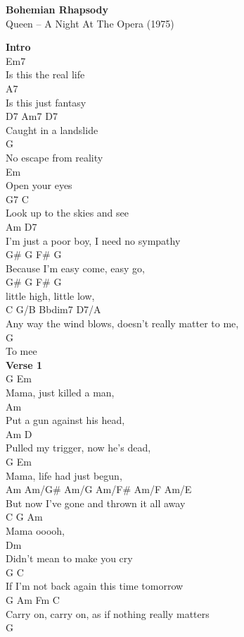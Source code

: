 \documentclass[a4paper]{article}
\begin{document}
    \begin{center}
        \textbf{Bohemian Rhapsody}
        ~\\
        Queen -- A Night At The Opera (1975)
    \end{center}
    {
        \scriptsize
        \textbf{Intro}
        ~\\
        {
            \cutive
            \obeyspaces
Em7
\\
Is this the real life
\\
A7
\\
Is this just fantasy
\\
D7          Am7 D7
\\
Caught in a landslide
\\
    G
\\
No escape from reality
\\
Em
\\
Open your eyes
\\
     G7                   C
\\
Look up to the skies and see
\\
Am                   D7
\\
I'm just a poor boy, I need no sympathy
\\
            G\#   G     F\#   G
\\
Because I'm easy come, easy go,
\\
G\#     G     F\#     G
\\
little high, little low,
\\
C           G/B         Bbdim7         D7/A
\\
Any way the wind blows, doesn't really matter to me,
\\
   G
\\
To mee 
\\

        }
        \textbf{Verse 1}
        ~\\
        {
            \cutive
            \obeyspaces
G          Em
\\
Mama, just killed a man,
\\
      Am
\\
Put a gun against his head,
\\
          Am                 D
\\
Pulled my trigger, now he's dead,
\\
G              Em
\\
Mama, life had just begun,
\\
    Am                Am/G\#     Am/G Am/F\#   Am/F Am/E
\\
But now I've gone and thrown it all  away
\\
C    G Am
\\
Mama ooooh,
\\
       Dm
\\
Didn't mean to make you cry
\\
   G                               C
\\
If I'm not back again this time tomorrow
\\
      G         Am        Fm                C
\\
Carry on, carry on, as if nothing really matters
\\
G
\\

}}
\end{document}
